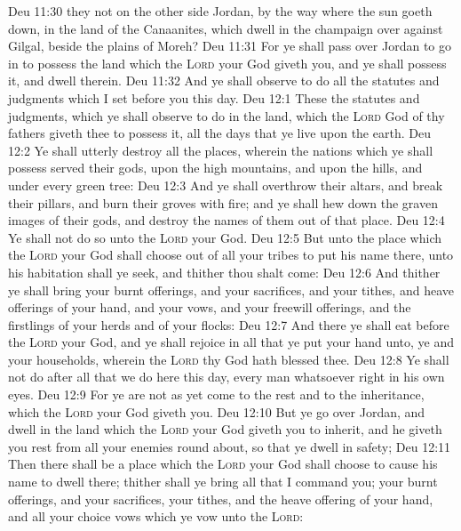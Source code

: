 \vs Deu 11:30  they not on the other side Jordan, by the way where the sun goeth down, in the land of the Canaanites, which dwell in the champaign over against Gilgal, beside the plains of Moreh?
\vs Deu 11:31 For ye shall pass over Jordan to go in to possess the land which the \textsc{Lord} your God giveth you, and ye shall possess it, and dwell therein.
\vs Deu 11:32 And ye shall observe to do all the statutes and judgments which I set before you this day.
\vs Deu 12:1 These  the statutes and judgments, which ye shall observe to do in the land, which the \textsc{Lord} God of thy fathers giveth thee to possess it, all the days that ye live upon the earth.
\vs Deu 12:2 Ye shall utterly destroy all the places, wherein the nations which ye shall possess served their gods, upon the high mountains, and upon the hills, and under every green tree:
\vs Deu 12:3 And ye shall overthrow their altars, and break their pillars, and burn their groves with fire; and ye shall hew down the graven images of their gods, and destroy the names of them out of that place.
\vs Deu 12:4 Ye shall not do so unto the \textsc{Lord} your God.
\vs Deu 12:5 But unto the place which the \textsc{Lord} your God shall choose out of all your tribes to put his name there,  unto his habitation shall ye seek, and thither thou shalt come:
\vs Deu 12:6 And thither ye shall bring your burnt offerings, and your sacrifices, and your tithes, and heave offerings of your hand, and your vows, and your freewill offerings, and the firstlings of your herds and of your flocks:
\vs Deu 12:7 And there ye shall eat before the \textsc{Lord} your God, and ye shall rejoice in all that ye put your hand unto, ye and your households, wherein the \textsc{Lord} thy God hath blessed thee.
\vs Deu 12:8 Ye shall not do after all  that we do here this day, every man whatsoever  right in his own eyes.
\vs Deu 12:9 For ye are not as yet come to the rest and to the inheritance, which the \textsc{Lord} your God giveth you.
\vs Deu 12:10 But  ye go over Jordan, and dwell in the land which the \textsc{Lord} your God giveth you to inherit, and  he giveth you rest from all your enemies round about, so that ye dwell in safety;
\vs Deu 12:11 Then there shall be a place which the \textsc{Lord} your God shall choose to cause his name to dwell there; thither shall ye bring all that I command you; your burnt offerings, and your sacrifices, your tithes, and the heave offering of your hand, and all your choice vows which ye vow unto the \textsc{Lord}:
